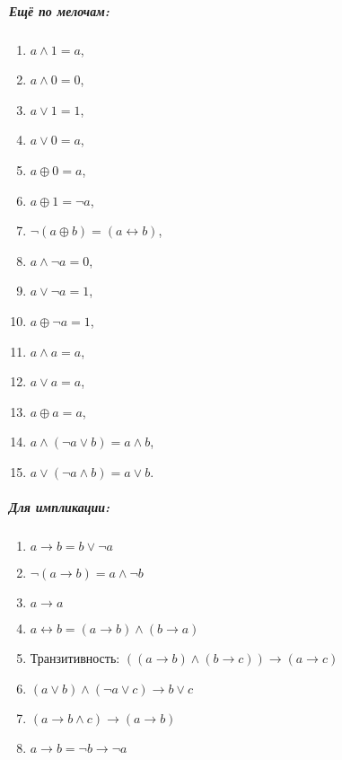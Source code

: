 \begin{thm}
\subparagraph{Ещё по мелочам:}
\begin{enumerate}
\item $a \land 1 = a$,
\item $a \land 0 = 0$,
\item $a \lor 1 = 1$,
\item $a \lor 0 = a$,
\item $a \oplus 0 = a$,
\item $a \oplus 1 = \neg a$,
\item $\neg (a \oplus b) = (a \leftrightarrow b)$,
\item $a \land \neg a = 0$,
\item $a \lor \neg a = 1$,
\item $a \oplus \neg a = 1$,
\item $a\land a = a$,
\item $a \lor a = a$,
\item $a \oplus a = a$,
\item $a \land (\neg a \lor b) = a \land b$,
\item $a \lor (\neg a \land b) = a \lor b$.
\end{enumerate}

\subparagraph{Для импликации:}
\begin{enumerate}
\item $a \rightarrow b = b \vee \neg a$
\item $\neg(a \rightarrow b) = a \wedge \neg b$
\item $a \rightarrow a$
\item $a \leftrightarrow b = (a \rightarrow b) \wedge (b\rightarrow a)$
\item Транзитивность: $((a \rightarrow b) \wedge (b \rightarrow c)) \rightarrow (a \rightarrow c)$
\item $(a \vee b) \wedge (\neg a \vee c) \rightarrow b \vee c$
\item $(a \rightarrow b \wedge c) \rightarrow (a \rightarrow b)$
\item $a \rightarrow b = \neg b \rightarrow \neg a$
\end{enumerate}
\end{thm}

